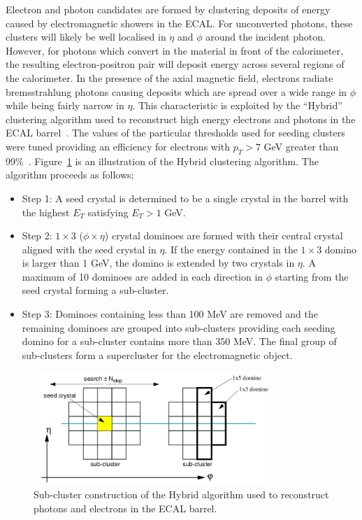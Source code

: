 Electron and photon candidates are formed by clustering deposits of 
energy caused by electromagnetic showers in the ECAL. For unconverted 
photons, these clusters will likely be well localised in $\eta$ and $\phi$
around the incident photon. However, for photons which convert in the material in front of the 
calorimeter, the resulting electron-positron pair will deposit energy across several regions
of the calorimeter. In the presence of the axial magnetic field, 
electrons radiate bremsstrahlung photons causing deposits which are 
spread over a wide range in $\phi$ while being fairly narrow in $\eta$.
This characteristic is exploited by the ``Hybrid'' clustering algorithm 
used to reconstruct high energy electrons and photons in
the ECAL barrel~\citep{cseez}. 
The values of the particular thresholds used for seeding clusters were tuned providing
an efficiency for electrons with $p_{T}>7$ GeV greater than 99\%~\citep{dfutyan}.
Figure~\ref{fig:hybridclustering} is an illustration of the Hybrid clustering algorithm.
The algorithm proceeds as follows;
\begin{itemize}
 \item Step 1: A seed crystal is determined to be a single crystal in the barrel with the highest
 $E_{T}$ satisfying $E_{T}>1$ GeV.
 \item Step 2: $1\times3$ ($\phi\times\eta$) crystal dominoes are formed with their central crystal 
 aligned with the seed crystal in $\eta$. If the energy contained in the $1\times3$ domino is 
 larger than 1 GeV, the domino is extended by two crystals in $\eta$. A maximum of 10 dominoes are 
 added in each direction in $\phi$ starting from the seed crystal forming a sub-cluster.
 \item Step 3: Dominoes containing less than 100 MeV are removed and the remaining dominoes are 
 grouped into sub-clusters providing each seeding domino for a sub-cluster contains more than 350 MeV. 
 The final group of sub-clusters form a supercluster for the electromagnetic object.
\end{itemize}

\begin{figure}
\begin{center}
	\includegraphics[width=0.8\textwidth]{detector/ecal/clustering.png}
	\caption{Sub-cluster construction of the Hybrid algorithm used to reconstruct photons and 
	electrons in the ECAL barrel.}
	\label{fig:hybridclustering}
\end{center}
\end{figure}


